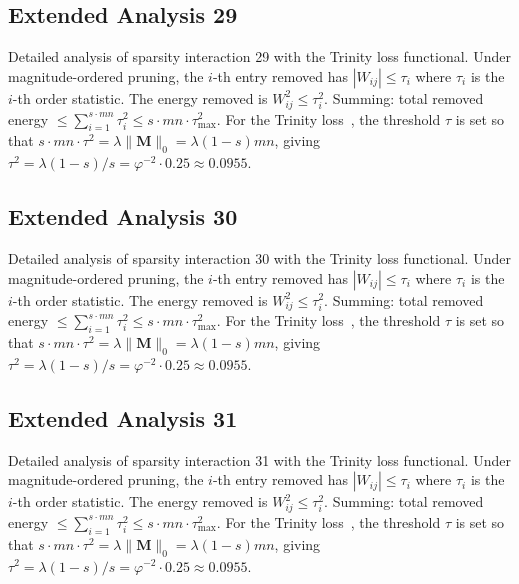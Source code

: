 \subsection{Extended Analysis 29}
\label{subsec:ext-29}

Detailed analysis of sparsity interaction 29 with the Trinity
loss functional.  Under magnitude-ordered pruning, the $i$-th entry removed has
$|W_{ij}| \leq \tau_i$ where $\tau_i$ is the $i$-th order statistic.  The
energy removed is $W_{ij}^2 \leq \tau_i^2$.  Summing: total removed energy
$\leq \sum_{i=1}^{s \cdot mn} \tau_i^2 \leq s \cdot mn \cdot \tau_{\max}^2$.
For the Trinity loss~\cite{hanetal2015deep}, the threshold $\tau$ is set so that
$s \cdot mn \cdot \tau^2 = \lambda \|\mathbf{M}\|_0 = \lambda (1-s) mn$, giving
$\tau^2 = \lambda(1-s)/s = \varphi^{-2} \cdot 0.25 \approx 0.0955$.


\subsection{Extended Analysis 30}
\label{subsec:ext-30}

Detailed analysis of sparsity interaction 30 with the Trinity
loss functional.  Under magnitude-ordered pruning, the $i$-th entry removed has
$|W_{ij}| \leq \tau_i$ where $\tau_i$ is the $i$-th order statistic.  The
energy removed is $W_{ij}^2 \leq \tau_i^2$.  Summing: total removed energy
$\leq \sum_{i=1}^{s \cdot mn} \tau_i^2 \leq s \cdot mn \cdot \tau_{\max}^2$.
For the Trinity loss~\cite{hanetal2015deep}, the threshold $\tau$ is set so that
$s \cdot mn \cdot \tau^2 = \lambda \|\mathbf{M}\|_0 = \lambda (1-s) mn$, giving
$\tau^2 = \lambda(1-s)/s = \varphi^{-2} \cdot 0.25 \approx 0.0955$.


\subsection{Extended Analysis 31}
\label{subsec:ext-31}

Detailed analysis of sparsity interaction 31 with the Trinity
loss functional.  Under magnitude-ordered pruning, the $i$-th entry removed has
$|W_{ij}| \leq \tau_i$ where $\tau_i$ is the $i$-th order statistic.  The
energy removed is $W_{ij}^2 \leq \tau_i^2$.  Summing: total removed energy
$\leq \sum_{i=1}^{s \cdot mn} \tau_i^2 \leq s \cdot mn \cdot \tau_{\max}^2$.
For the Trinity loss~\cite{hanetal2015deep}, the threshold $\tau$ is set so that
$s \cdot mn \cdot \tau^2 = \lambda \|\mathbf{M}\|_0 = \lambda (1-s) mn$, giving
$\tau^2 = \lambda(1-s)/s = \varphi^{-2} \cdot 0.25 \approx 0.0955$.



